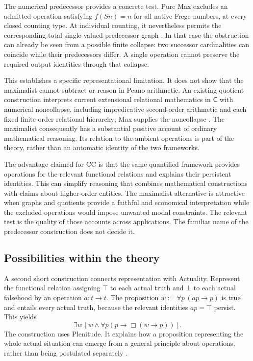 \documentclass[11pt]{article}
\newcommand{\C}{\mathsf C}
\begin{document}
The numerical predecessor provides a concrete test. Pure Max excludes an admitted operation satisfying $f(Sn)=n$ for all native Frege numbers, at every closed counting type. At individual counting, it nevertheless permits the corresponding total single-valued predecessor graph \citep{predecessor}. In that case the obstruction can already be seen from a possible finite collapse: two successor cardinalities can coincide while their predecessors differ. A single operation cannot preserve the required output identities through that collapse.

This establishes a specific representational limitation. It does not show that the maximalist cannot subtract or reason in Peano arithmetic. An existing quotient construction interprets current extensional relational mathematics in $\C$ with numerical noncollapse, including impredicative second-order arithmetic and each fixed finite-order relational hierarchy; Max supplies the noncollapse \citep[\S29]{coding}. The maximalist consequently has a substantial positive account of ordinary mathematical reasoning. Its relation to the ambient operations is part of the theory, rather than an automatic identity of the two frameworks.

The advantage claimed for CC is that the same quantified framework provides operations for the relevant functional relations and explains their persistent identities. This can simplify reasoning that combines mathematical constructions with claims about higher-order entities. The maximalist alternative is attractive when graphs and quotients provide a faithful and economical interpretation while the excluded operations would impose unwanted modal constraints. The relevant test is the quality of those accounts across applications. The familiar name of the predecessor construction does not decide it.

\subsection{Possibilities within the theory}

A second short construction connects representation with Actuality. Represent the functional relation assigning $\top$ to each actual truth and $\bot$ to each actual falsehood by an operation $a:t\to t$. The proposition $w:=\forall p\,(ap\to p)$ is true and entails every actual truth, because the relevant identities $ap=\top$ persist. This yields
\[
 \exists w\,[w\land\forall p(p\to\Box(w\to p))].
\]
The construction uses Plenitude. It explains how a proposition representing the whole actual situation can emerge from a general principle about operations, rather than being postulated separately \citep[\S2.3]{bacondorr}.
\end{document}
